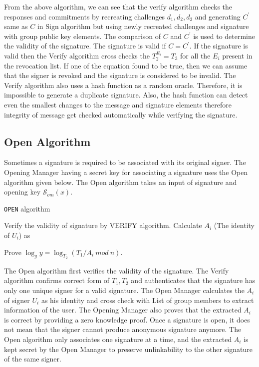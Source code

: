 From the above algorithm, we can see that the verify algorithm checks the responses and commitments by recreating challenges $d_1, d_2, d_3$ and generating $C^\prime$ same as $C$ in Sign algorithm but using newly recreated challenges and signature with group public key elements. The comparison of $C$ and $C^\prime$ is used to determine the validity of the signature. The signature is valid if $C = C^\prime$. If the signature is valid then the Verify algorithm cross checks the $T_2^{E_i} = T_3$ for all the $E_i$ present in the revocation list. If one of the equation found to be true, then we can assume that the signer is revoked and the signature is considered to be invalid. The Verify algorithm also uses a hash function as a random oracle. Therefore, it is impossible to generate a duplicate signature. Also, the hash function can detect even the smallest changes to the message and signature elements therefore integrity of message get checked automatically while verifying the signature. 

\subsection{Open Algorithm}
Sometimes a signature is required to be associated with its original signer. The Opening Manager having a secret key for associating a signature uses the Open algorithm given below. The Open algorithm takes an input of signature and opening key $\mathcal{S}_{om}(x)$.

\begin{algorithm}
\caption{\texttt{OPEN} algorithm}
\begin{algorithmic}[1]
\vspace{10pt}
\STATE Verify the validity of signature by VERIFY algorithm.
\STATE Calculate $A_i$ (The identity of $U_i$) as
\begin{center}
\end{center}
\STATE Prove $\log_gy = \log_{T_2}(T_1 / A_i ~mod~n)$.
\vspace{10pt}
\end{algorithmic}
\end{algorithm}

The Open algorithm first verifies the validity of the signature. The Verify algorithm confirms correct form of $T_1, T_2$ and authenticates that the signature has only one unique signer for a valid signature. The Open Manager calculates the $A_i$ of signer $U_i$ as his identity and cross check with List of group members to extract information of the user. The Opening Manager also proves that the extracted $A_i$ is correct by providing a zero knowledge proof. Once a signature is open, it does not mean that the signer cannot produce anonymous signature anymore. The Open algorithm only associates one signature at a time, and the extracted $A_i$ is kept secret by the Open Manager to preserve unlinkability to the other signature of the same signer.

